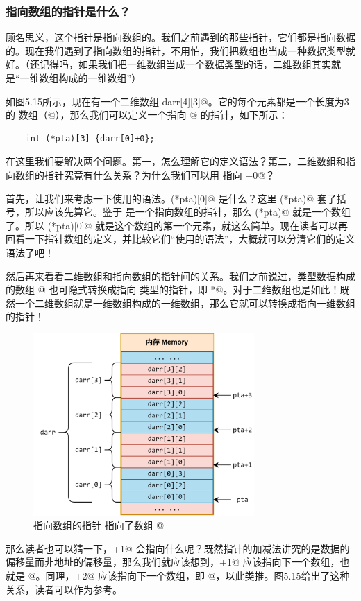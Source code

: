 \subsubsection*{指向数组的指针是什么？}
顾名思义，这个指针是指向数组的。我们之前遇到的那些指针，它们都是指向数据的。现在我们遇到了指向数组的指针，不用怕，我们把数组也当成一种数据类型就好。（还记得吗，如果我们把一维数组当成一个数据类型的话，二维数组其实就是``一维数组构成的一维数组''）\par
如图5.15所示，现在有一个二维数组 \lstinline@int darr[4][3]@。它的每个元素都是一个长度为3的 \lstinline@int@ 数组（\lstinline@int[3]@），那么我们可以定义一个指向 \lstinline@darr[0]@ 的指针，如下所示：
\begin{lstlisting}
    int (*pta)[3] {darr[0]+0};
\end{lstlisting}
在这里我们要解决两个问题。第一，怎么理解它的定义语法？第二，二维数组和指向数组的指针究竟有什么关系？为什么我们可以用 \lstinline@pta@ 指向 \lstinline@darr[0]+0@？\par
首先，让我们来考虑一下使用的语法。\lstinline@(*pta)[0]@ 是什么？这里 \lstinline@(*pta)@ 套了括号，所以应该先算它。鉴于 \lstinline@pta@ 是一个指向数组的指针，那么 \lstinline@(*pta)@ 就是一个数组了。所以 \lstinline@(*pta)[0]@ 就是这个数组的第一个元素，就这么简单。现在读者可以再回看一下指针数组的定义，并比较它们``使用的语法''，大概就可以分清它们的定义语法了吧！\par
然后再来看看二维数组和指向数组的指针间的关系。我们之前说过，\lstinline@T@ 类型数据构成的数组 \lstinline@T[N]@ 也可隐式转换成指向 \lstinline@T@ 类型的指针，即 \lstinline@T*@。对于二维数组也是如此！既然一个二维数组就是一维数组构成的一维数组，那么它就可以转换成指向一维数组的指针！\par
\begin{figure}[htbp]
    \centering
    \includegraphics[width=0.75\textwidth]{../images/generalized_parts/05_the_pointer_to_array_and_2d_array.png}
    \caption{指向数组的指针 \lstinline@pta@ 指向了数组 \lstinline@darr[0]@}
\end{figure}
那么读者也可以猜一下，\lstinline@pta+1@ 会指向什么呢？既然指针的加减法讲究的是数据的偏移量而非地址的偏移量，那么我们就应该想到，\lstinline@pta+1@ 应该指向下一个数组，也就是 \lstinline@darr[1]@。同理，\lstinline@pta+2@ 应该指向下一个数组，即 \lstinline@darr[2]@，以此类推。图5.15给出了这种关系，读者可以作为参考。\par
